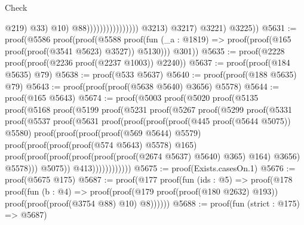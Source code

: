 \begin{lexlean}{Check}
\begin{coremodule}
                                                                    @219)
                                                                  @33)
                                                                @10)
                                                              @88))))))))))))))))
              @3213)
            @3217)
          @3221)
        @3225))
@5631 := proof(@5586
      proof(proof(@5588
            proof(fun (_a : @1819) => proof(proof(@165 proof(proof(@3541 @5623) @3527)) @5130)))
          @301))
@5635 := proof(@2228 proof(proof(@2236 proof(@2237 @1003)) @2240))
@5637 := proof(proof(@184 @5635) @79)
@5638 := proof(@533 @5637)
@5640 := proof(proof(@188 @5635) @79)
@5643 := proof(proof(proof(@5638 @5640) @3656) @5578)
@5644 := proof(@165 @5643)
@5674 := proof(@5003
      proof(@5020
          proof(@5135
              proof(@5168
                  proof(@5199
                      proof(@5231
                          proof(@5267
                              proof(@5299
                                  proof(@5331
                                      proof(@5537
                                          proof(@5631
                                              proof(proof(proof(proof(@445 proof(@5644 @5075))
                                                      @5580)
                                                    proof(proof(proof(proof(@569 @5644) @5579)
                                                          proof(proof(proof(proof(@574 @5643) @5578)
                                                                @165)
                                                              proof(proof(proof(proof(proof(proof(@2674
                                                                            @5637)
                                                                          @5640)
                                                                        @365)
                                                                      @164)
                                                                    @3656)
                                                                  @5578)))
                                                        @5075))
                                                  @413))))))))))))
@5675 := proof(Exists.casesOn.{1})
@5676 := proof(@5675 @175)
@5687 := proof(@177
      proof(fun (ids : @5) =>
        proof(@178
            proof(fun (b : @4) =>
              proof(proof(@179 proof(proof(@180 @2632) @193))
                  proof(proof(proof(@3754 @88) @10) @8))))))
@5688 := proof(fun (strict : @175) => @5687)

\end{coremodule}
\end{lexlean}
